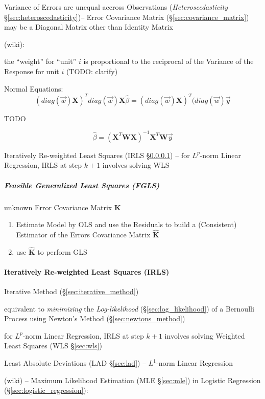 Variance of Errors are unequal accross Observations (\emph{Heteroscedasticity}
\S\ref{sec:heteroscedasticity})-- Error Covariance Matrix
(\S\ref{sec:covariance_matrix}) may be a Diagonal Matrix other than Identity
Matrix

(wiki):

the ``weight'' for ``unit'' $i$ is proportional to the reciprocal of the
Variance of the Response for unit $i$ (TODO: clarify)

Normal Equations:
\[
  (diag(\vec{w})\mathbf{X})^T diag(\vec{w})\mathbf{X} \hat{\beta}
    = (diag(\vec{w})\mathbf{X})^T (diag(\vec{w})\vec{y}
\]

TODO

\[
  \hat{\beta} = (\mathbf{X}^T \mathbf{W X})^{-1} \mathbf{X}^T \mathbf{W} \vec{y}
\]

\fist Iteratively Re-weighted Least Squares (IRLS \S\ref{sec:irls}) -- for
$L^p$-norm Linear Regression, IRLS at step $k+1$ involves solving WLS



\subparagraph{Feasible Generalized Least Squares (FGLS)}\label{sec:fgls}\hfill

unknown Error Covariance Matrix $\mathbf{K}$

\begin{enumerate}
  \item Estimate Model by OLS and use the Residuals to build a (Consistent)
    Estimator of the Errors Covariance Matrix $\hat{\mathbf{K}}$
  \item use $\hat{\mathbf{K}}$ to perform GLS
\end{enumerate}



\paragraph{Iteratively Re-weighted Least Squares (IRLS)}\label{sec:irls}\hfill

Iterative Method (\S\ref{sec:iterative_method})

equivalent to \emph{minimizing} the \emph{Log-likelihood}
(\S\ref{sec:log_likelihood}) of a Bernoulli Process using Newton's Method
(\S\ref{sec:newtons_method})

for $L^p$-norm Linear Regression, IRLS at step $k+1$ involves solving Weighted
Least Squares (WLS \S\ref{sec:wls})

Least Absolute Deviations (LAD \S\ref{sec:lad}) -- $L^1$-norm Linear Regression

(wiki) --
Maximum Likelihood Estimation (MLE \S\ref{sec:mle}) in Logistic Regression
(\S\ref{sec:logistic_regression}):


